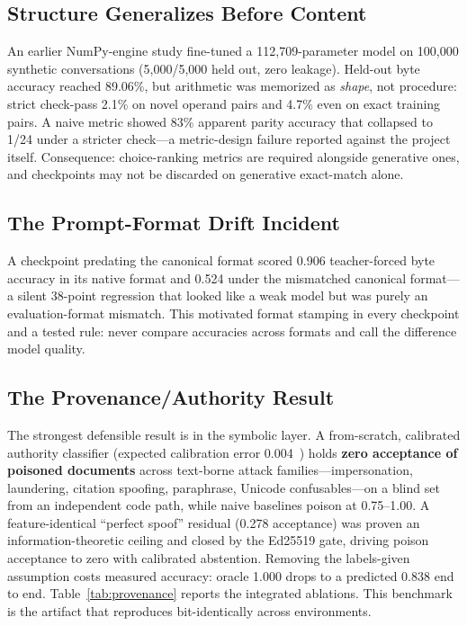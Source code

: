 \documentclass[journal]{IEEEtran}
\begin{document}
\subsection{Structure Generalizes Before Content}
An earlier NumPy-engine study fine-tuned a 112{,}709-parameter model on 100{,}000 synthetic conversations (5{,}000/5{,}000 held out, zero leakage). Held-out byte accuracy reached 89.06\%, but arithmetic was memorized as \emph{shape}, not procedure: strict check-pass 2.1\% on novel operand pairs and 4.7\% even on exact training pairs. A naive metric showed 83\% apparent parity accuracy that collapsed to 1/24 under a stricter check---a metric-design failure reported against the project itself. Consequence: choice-ranking metrics are required alongside generative ones, and checkpoints may not be discarded on generative exact-match alone.

\subsection{The Prompt-Format Drift Incident}
A checkpoint predating the canonical format scored 0.906 teacher-forced byte accuracy in its native format and 0.524 under the mismatched canonical format---a silent 38-point regression that looked like a weak model but was purely an evaluation-format mismatch. This motivated format stamping in every checkpoint and a tested rule: never compare accuracies across formats and call the difference model quality.

\subsection{The Provenance/Authority Result}
The strongest defensible result is in the symbolic layer. A from-scratch, calibrated authority classifier (expected calibration error 0.004~\cite{Guo2017}) holds \textbf{zero acceptance of poisoned documents} across text-borne attack families---impersonation, laundering, citation spoofing, paraphrase, Unicode confusables---on a blind set from an independent code path, while naive baselines poison at 0.75--1.00. A feature-identical ``perfect spoof'' residual (0.278 acceptance) was proven an information-theoretic ceiling and closed by the Ed25519 gate, driving poison acceptance to zero with calibrated abstention. Removing the labels-given assumption costs measured accuracy: oracle 1.000 drops to a predicted 0.838 end to end. Table~\ref{tab:provenance} reports the integrated ablations. This benchmark is the artifact that reproduces bit-identically across environments.
\end{document}
